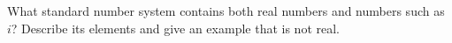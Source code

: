 What standard number system contains both real numbers and numbers such as $i$? Describe its elements and give an example that is not real.

